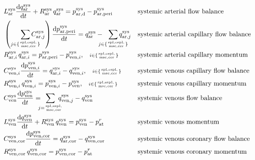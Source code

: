 \documentclass[a4paper,12pt]{report}
\begin{document}
\begin{align}
&L_{\mathrm{ar}}^{\mathrm{sys}}\frac{\mathrm{d}q_{\mathrm{ar}}^{\mathrm{sys}}}{\mathrm{d}t} + R_{\mathrm{ar}}^{\mathrm{sys}}\,q_{\mathrm{ar}}^{\mathrm{sys}}=p_{\mathrm{ar,d}}^{\mathrm{sys}} -p_{\mathrm{ar,peri}}^{\mathrm{sys}} && \text{systemic arterial flow balance}\nonumber\\
&\left(\sum_{j\in\{\mathrm{spl,espl,\atop msc,cer}\}}\!\!\!\!\!\!\!\!\!C_{\mathrm{ar},j}^{\mathrm{sys}}\right) \frac{\mathrm{d}p_{\mathrm{ar,peri}}^{\mathrm{sys}}}{\mathrm{d}t} = q_{\mathrm{ar}}^{\mathrm{sys}}-\!\!\!\!\!\sum_{j\in\{\mathrm{spl,espl,\atop msc,cer}\}}\!\!\!\!\!\!\!\!\!q_{\mathrm{ar},j}^{\mathrm{sys}} && \text{systemic arterial capillary flow balance}\nonumber\\
&R_{\mathrm{ar},i}^{\mathrm{sys}}\,q_{\mathrm{ar},i}^{\mathrm{sys}} = p_{\mathrm{ar,peri}}^{\mathrm{sys}} - p_{\mathrm{ven},i}^{\mathrm{sys}}, \quad\scriptstyle{i\in\{\mathrm{spl,espl,\atop msc,cer}\}} && \text{systemic arterial capillary momentum}\nonumber\\
&C_{\mathrm{ven},i}^{\mathrm{sys}} \frac{\mathrm{d}p_{\mathrm{ven},i}^{\mathrm{sys}}}{\mathrm{d}t} = q_{\mathrm{ar},i}^{\mathrm{sys}} - q_{\mathrm{ven},i}^{\mathrm{sys}}, \quad\scriptstyle{i\in\{\mathrm{spl,espl,\atop msc,cer}\}} && \text{systemic venous capillary flow balance}\nonumber\\
&R_{\mathrm{ven},i}^{\mathrm{sys}}\,q_{\mathrm{ven},i}^{\mathrm{sys}} = p_{\mathrm{ven},i}^{\mathrm{sys}}-p_{\mathrm{ven}}^{\mathrm{sys}}, \quad\scriptstyle{i\in\{\mathrm{spl,espl,\atop msc,cer}\}} && \text{systemic venous capillary momentum}\nonumber\\
&C_{\mathrm{ven}}^{\mathrm{sys}} \frac{\mathrm{d}p_{\mathrm{ven}}^{\mathrm{sys}}}{\mathrm{d}t} = \!\!\!\!\sum_{j=\mathrm{spl,espl,\atop msc,cer}}\!\!\!\!\!q_{\mathrm{ven},j}^{\mathrm{sys}}-q_{\mathrm{ven}}^{\mathrm{sys}} && \text{systemic venous flow balance}\nonumber\\
&L_{\mathrm{ven}}^{\mathrm{sys}}\frac{\mathrm{d}q_{\mathrm{ven}}^{\mathrm{sys}}}{\mathrm{d}t} + R_{\mathrm{ven}}^{\mathrm{sys}}\, q_{\mathrm{ven}}^{\mathrm{sys}} = p_{\mathrm{ven}}^{\mathrm{sys}} - p_{\mathrm{at}}^{r} && \text{systemic venous momentum}\nonumber\\
&C_{\mathrm{ven,cor}}^{\mathrm{sys}} \frac{\mathrm{d}p_{\mathrm{ven,cor}}^{\mathrm{sys}}}{\mathrm{d}t} = q_{\mathrm{ar,cor}}^{\mathrm{sys}}-q_{\mathrm{ven,cor}}^{\mathrm{sys}} && \text{systemic venous coronary flow balance}\nonumber\\
&R_{\mathrm{ven,cor}}^{\mathrm{sys}}\,q_{\mathrm{ven,cor}}^{\mathrm{sys}} = p_{\mathrm{ven,cor}}^{\mathrm{sys}} - p_{\mathrm{at}}^{r} && \text{systemic venous coronary momentum}\nonumber
\end{align}
\end{document}

